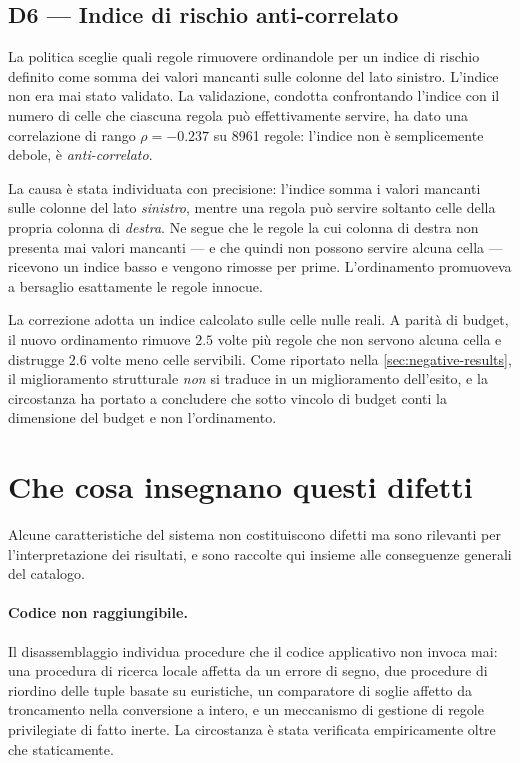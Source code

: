 \subsection{D6 --- Indice di rischio anti-correlato}\label{sec:d6}

La politica  sceglie quali regole rimuovere ordinandole per un indice di rischio
definito come somma dei valori mancanti sulle colonne del lato sinistro. L'indice non era mai
stato validato. La validazione, condotta confrontando l'indice con il numero di celle che ciascuna
regola può effettivamente servire, ha dato una correlazione di rango $\rho = -0.237$ su
\num{8961} regole: l'indice non è semplicemente debole, è \emph{anti-correlato}.

La causa è stata individuata con precisione: l'indice somma i valori mancanti sulle colonne del
lato \emph{sinistro}, mentre una regola può servire soltanto celle della propria colonna di
\emph{destra}. Ne segue che le regole la cui colonna di destra non presenta mai valori mancanti
--- e che quindi non possono servire alcuna cella --- ricevono un indice basso e vengono rimosse
per prime. L'ordinamento promuoveva a bersaglio esattamente le regole innocue.

La correzione adotta un indice calcolato sulle celle nulle reali. A parità di budget, il nuovo
ordinamento rimuove $2.5$ volte più regole che non servono alcuna cella e distrugge $2.6$ volte
meno celle servibili. Come riportato nella \autoref{sec:negative-results}, il miglioramento
strutturale \emph{non} si traduce in un miglioramento dell'esito, e la circostanza ha portato a
concludere che sotto vincolo di budget conti la dimensione del budget e non l'ordinamento.

\section{Che cosa insegnano questi difetti}\label{sec:system-behaviour}

Alcune caratteristiche del sistema non costituiscono difetti ma sono rilevanti per
l'interpretazione dei risultati, e sono raccolte qui insieme alle conseguenze generali del
catalogo.

\paragraph{Codice non raggiungibile.} Il disassemblaggio individua procedure che il codice
applicativo non invoca mai: una procedura di ricerca locale affetta da un errore di segno, due
procedure di riordino delle tuple basate su euristiche, un comparatore di soglie affetto da
troncamento nella conversione a intero, e un meccanismo di gestione di regole privilegiate di
fatto inerte. La circostanza è stata verificata empiricamente oltre che staticamente.

